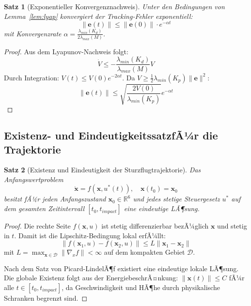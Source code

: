 ﻿\documentclass[12pt,a4paper]{article}
\newtheorem{theorem}{Satz}[section]
\theoremstyle{remark}
\begin{document}
	\begin{theorem}[Exponentieller Konvergenznachweis]
		\label{thm:konvergenz}
		Unter den Bedingungen von Lemma~\ref{lem:lyap} konvergiert der Tracking-Fehler exponentiell:
		\begin{equation}
			\|\mathbf{e}(t)\| \leq \|\mathbf{e}(0)\| \cdot e^{-\alpha t}
		\end{equation}
		mit Konvergenzrate $\alpha = \frac{\lambda_{min}(K_d)}{2\lambda_{max}(M)}$.
	\end{theorem}
	
	\begin{proof}
		Aus dem Lyapunov-Nachweis folgt:
		\begin{equation}
			\dot{V} \leq -\frac{\lambda_{min}(K_d)}{\lambda_{max}(M)} V
		\end{equation}
		Durch Integration: $V(t) \leq V(0) e^{-2\alpha t}$. Da $V \geq \frac{1}{2}\lambda_{min}(K_p) \|\mathbf{e}\|^2$:
		\begin{equation}
			\|\mathbf{e}(t)\| \leq \sqrt{\frac{2V(0)}{\lambda_{min}(K_p)}} e^{-\alpha t}
		\end{equation}
	\end{proof}

	\subsection{Existenz- und EindeutigkeitssatzfÃ¼r die Trajektorie}
	
	\begin{theorem}[Existenz und Eindeutigkeit der Sturzflugtrajektorie]
		Das Anfangswertproblem
		\begin{equation}
			\dot{\mathbf{x}} = f(\mathbf{x}, u^*(t)), \quad \mathbf{x}(t_0) = \mathbf{x}_0
		\end{equation}
		besitzt fÃ¼r jeden Anfangszustand $\mathbf{x}_0 \in \mathbb{R}^6$ und jedes stetige Steuergesetz $u^*$ auf dem gesamten Zeitintervall $[t_0, t_{impact}]$ eine eindeutige LÃ¶sung.
	\end{theorem}
	
	\begin{proof}
		Die rechte Seite $f(\mathbf{x}, u)$ ist stetig differenzierbar bezÃ¼glich $\mathbf{x}$ und stetig in $t$. Damit ist die Lipschitz-Bedingung lokal erfÃ¼llt:
		\begin{equation}
			\|f(\mathbf{x}_1, u) - f(\mathbf{x}_2, u)\| \leq L \|\mathbf{x}_1 - \mathbf{x}_2\|
		\end{equation}
		mit $L = \max_{\mathbf{x} \in \mathcal{D}} \|\nabla_x f\| < \infty$ auf dem kompakten Gebiet $\mathcal{D}$.
		
		Nach dem Satz von Picard-LindelÃ¶f existiert eine eindeutige lokale LÃ¶sung. Die globale Existenz folgt aus der EnergiebeschrÃ¤nkung: $\|\mathbf{x}(t)\| \leq C$ fÃ¼r alle $t \in [t_0, t_{impact}]$, da Geschwindigkeit und HÃ¶he durch physikalische Schranken begrenzt sind.
	\end{proof}
	
\end{document}
